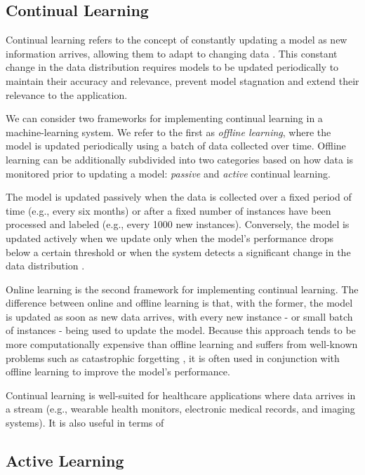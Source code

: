 \documentclass[../main.tex]{subfiles}
\begin{document}
    
	
	\subsection{Continual Learning} \label{sec:continual_learning} 
	
	 Continual learning refers to the concept of constantly updating a model as new information arrives, allowing them to adapt to changing data \cite{huyen_designing_2022}. This constant change in the data distribution requires models to be updated periodically to maintain their accuracy and relevance, prevent model stagnation and extend their relevance to the application.

     We can consider two frameworks for implementing continual learning in a machine-learning system. We refer to the first as \textit{offline learning}, where the model is updated periodically using a batch of data collected over time. Offline learning can be additionally subdivided into two categories based on how data is monitored prior to updating a model: \textit{passive} and \textit{active} continual learning.

     The model is updated passively when the data is collected over a fixed period of time (e.g., every six months) or after a fixed number of instances have been processed and labeled (e.g., every 1000 new instances). Conversely, the model is updated actively when we update only when the model's performance drops below a certain threshold or when the system detects a significant change in the data distribution \cite{huyen_designing_2022}.

    Online learning is the second framework for implementing continual learning. The difference between online and offline learning is that, with the former, the model is updated as soon as new data arrives, with every new instance - or small batch of instances - being used to update the model. Because this approach tends to be more computationally expensive than offline learning and suffers from well-known problems such as catastrophic forgetting \cite{huyen_designing_2022}, it is often used in conjunction with offline learning to improve the model's performance. 

    Continual learning is well-suited for healthcare applications where data arrives in a stream (e.g., wearable health monitors, electronic medical records, and imaging systems). It is also useful in terms of 


    \subsection{Active Learning} \label{sec:active_learning} 
 
\end{document}
